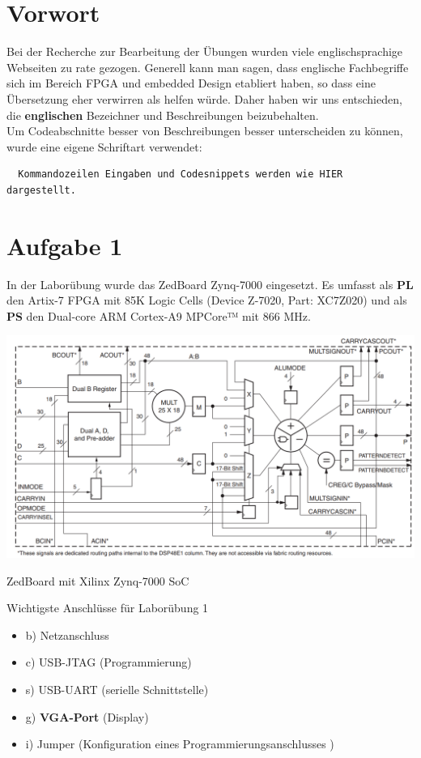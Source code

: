 \section{Vorwort}
Bei der Recherche zur Bearbeitung der Übungen wurden viele englischsprachige Webseiten zu rate gezogen. Generell kann man sagen, dass englische Fachbegriffe sich im Bereich FPGA und embedded Design etabliert haben, so dass eine Übersetzung eher verwirren als helfen würde. Daher haben wir uns entschieden, die \textbf{englischen} Bezeichner und Beschreibungen beizubehalten.\\
Um Codeabschnitte besser von Beschreibungen besser unterscheiden zu können, wurde eine eigene Schriftart verwendet:
\begin{verbatim}
  Kommandozeilen Eingaben und Codesnippets werden wie HIER dargestellt.
\end{verbatim}

\section{Aufgabe 1} \label{ex1}
In der Laborübung wurde das ZedBoard Zynq-7000 eingesetzt. Es umfasst als \textbf{PL} den Artix-7 FPGA mit 85K Logic Cells (Device Z-7020, Part: XC7Z020) und als \textbf{PS} den Dual-core ARM Cortex-A9 MPCore™ mit 866 MHz.

\begin{minipage}{\textwidth}
    \begin{center}        
        \includegraphics[scale=0.5]{img/DSP48e.png} 
    \end{center}
\end{minipage}
\begin{center}
ZedBoard mit Xilinx Zynq-7000 SoC
\end{center}

Wichtigste Anschlüsse für Laborübung 1
\begin{itemize}
\item b) Netzanschluss
\item c) USB-JTAG (Programmierung)
\item s) USB-UART (serielle Schnittstelle)
\item g) \textbf{VGA-Port} (Display)
\item i) Jumper (Konfiguration eines Programmierungsanschlusses )
\end{itemize}

